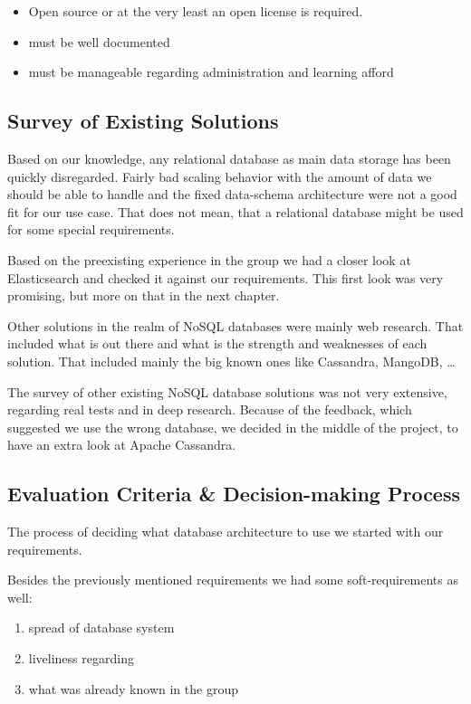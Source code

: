 \begin{itemize}
\tightlist
\item
  Open source or at the very least an open license is required.
\item
  must be well documented
\item
  must be manageable regarding administration and learning afford
\end{itemize}

\subsection{Survey of Existing
Solutions}\label{survey-of-existing-solutions}

Based on our knowledge, any relational database as main data storage has
been quickly disregarded. Fairly bad scaling behavior with the amount of
data we should be able to handle and the fixed data-schema architecture
were not a good fit for our use case. That does not mean, that a
relational database might be used for some special requirements.

Based on the preexisting experience in the group we had a closer look at
Elasticsearch and checked it against our requirements. This first look
was very promising, but more on that in the next chapter.

Other solutions in the realm of NoSQL databases were mainly web
research. That included what is out there and what is the strength and
weaknesses of each solution. That included mainly the big known ones
like Cassandra, MangoDB, \ldots{}

The survey of other existing NoSQL database solutions was not very
extensive, regarding real tests and in deep research. Because of the
feedback, which suggested we use the wrong database, we decided in the
middle of the project, to have an extra look at Apache Cassandra.

\subsection{Evaluation Criteria \& Decision-making
Process}\label{evaluation-criteria-decision-making-process}

The process of deciding what database architecture to use we started
with our requirements.

Besides the previously mentioned requirements we had some
soft-requirements as well:

\begin{enumerate}
\def\labelenumi{\arabic{enumi}.}
\tightlist
\item
  spread of database system
\item
  liveliness regarding
\item
  what was already known in the group
\end{enumerate}

